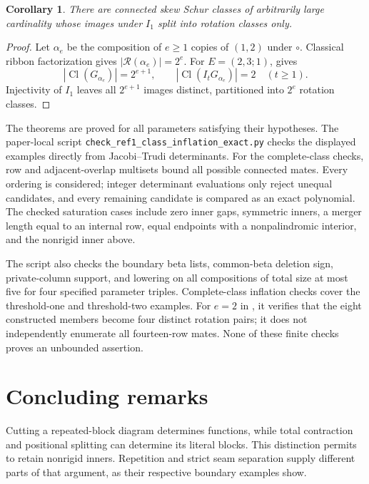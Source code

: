 \documentclass[11pt,a4paper]{amsart}
\numberwithin{equation}{section}
\theoremstyle{plain}
\newtheorem{corollary}[theorem]{Corollary}
\theoremstyle{definition}
\begin{document}
\begin{corollary}\label{cor:unbounded-class-splitting}
There are connected skew Schur classes of arbitrarily large cardinality
whose images under \(I_1\) split into rotation classes only.
\end{corollary}

\begin{proof}
Let \(\alpha_e\) be the composition of \(e\ge1\) copies of
\((1,2)\) under \(\circ\).  Classical ribbon factorization gives
\(|\mathcal R(\alpha_e)|=2^e\).
For \(E=(2,3;1)\),  gives
\[
 |\operatorname{Cl}(G_{\alpha_e})|=2^{e+1},\qquad
 |\operatorname{Cl}(I_tG_{\alpha_e})|=2\quad(t\ge1).
\]
Injectivity of \(I_1\) leaves all \(2^{e+1}\) images distinct,
partitioned into \(2^e\) rotation classes.
\end{proof}

The theorems are proved for all parameters satisfying their hypotheses.
The paper-local script \texttt{check\_ref1\_class\_inflation\_exact.py}
checks the displayed examples directly from Jacobi--Trudi determinants.
For the complete-class checks, row and adjacent-overlap multisets bound
all possible connected mates.  Every ordering is considered; integer
determinant evaluations only reject unequal candidates, and every
remaining candidate is compared as an exact polynomial.  The checked
saturation cases include zero inner gaps, symmetric inners, a merger
length equal to an internal row, equal endpoints with a nonpalindromic
interior, and the nonrigid inner above.

The script also checks the boundary beta lists, common-beta deletion sign,
private-column support, and lowering on all compositions of total size
at most five for four specified parameter triples.  Complete-class
inflation checks cover the threshold-one and threshold-two examples.
For \(e=2\) in , it verifies that
the eight constructed members become four distinct rotation pairs;
it does not independently enumerate all fourteen-row mates.  None of
these finite checks proves an unbounded assertion.

\section{Concluding remarks}\label{sec:conclusion}

Cutting a repeated-block diagram determines functions, while total
contraction and positional splitting can determine its literal blocks.
This distinction permits  to retain
nonrigid inners.  Repetition and strict seam separation supply different
parts of that argument, as their respective boundary examples show.
\end{document}
